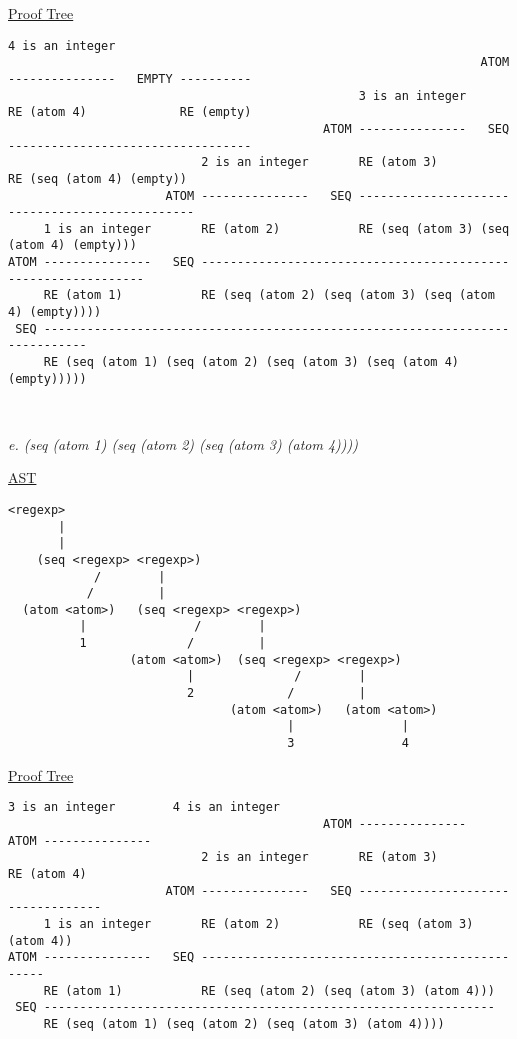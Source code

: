 \documentclass{article}
\begin{document}
\underline{Proof Tree}
\begin{lstlisting}[language=vasu]
                                                                       4 is an integer
                                                                  ATOM ---------------   EMPTY ----------
                                                 3 is an integer       RE (atom 4)             RE (empty)
                                            ATOM ---------------   SEQ ----------------------------------
                           2 is an integer       RE (atom 3)           RE (seq (atom 4) (empty))
                      ATOM ---------------   SEQ -----------------------------------------------
     1 is an integer       RE (atom 2)           RE (seq (atom 3) (seq (atom 4) (empty)))
ATOM ---------------   SEQ --------------------------------------------------------------     
     RE (atom 1)           RE (seq (atom 2) (seq (atom 3) (seq (atom 4) (empty))))
 SEQ ----------------------------------------------------------------------------        
     RE (seq (atom 1) (seq (atom 2) (seq (atom 3) (seq (atom 4) (empty)))))    
      
      
\end{lstlisting}

\begin{quoting}
\textit{e. (seq (atom 1) (seq (atom 2) (seq (atom 3) (atom 4))))}
\end{quoting}

\underline{AST}
\begin{lstlisting}[language=vasu]
    <regexp>
       |
       |
    (seq <regexp> <regexp>)
            /        |
           /         |
  (atom <atom>)   (seq <regexp> <regexp>)
          |               /        |
          1              /         |
                 (atom <atom>)  (seq <regexp> <regexp>)
                         |              /        |
                         2             /         |
                               (atom <atom>)   (atom <atom>)
                                       |               |
                                       3               4     

\end{lstlisting}

\underline{Proof Tree}
\begin{lstlisting}[language=vasu]
                                                 3 is an integer        4 is an integer
                                            ATOM ---------------   ATOM ---------------
                           2 is an integer       RE (atom 3)            RE (atom 4)
                      ATOM ---------------   SEQ ----------------------------------
     1 is an integer       RE (atom 2)           RE (seq (atom 3) (atom 4))
ATOM ---------------   SEQ ------------------------------------------------    
     RE (atom 1)           RE (seq (atom 2) (seq (atom 3) (atom 4)))
 SEQ ---------------------------------------------------------------       
     RE (seq (atom 1) (seq (atom 2) (seq (atom 3) (atom 4))))    
      
      
\end{lstlisting}
\newpage
\end{document}
